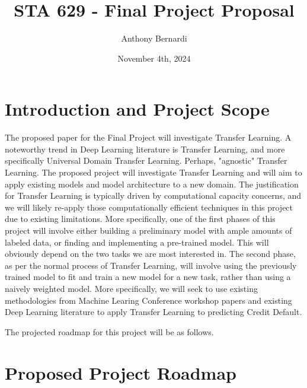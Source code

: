 \documentclass[12pt, letterpaper]{article}
\title{STA 629 - Final Project Proposal}
\author{Anthony Bernardi}
\date{November 4th, 2024}
\begin{document}
\maketitle

\section{Introduction and Project Scope}

The proposed paper for the Final Project will investigate Transfer Learning. A noteworthy trend in Deep Learning literature is Transfer Learning, and more specifically Universal Domain Transfer Learning. Perhaps, "agnostic" Transfer Learning. The proposed project will investigate Transfer Learning and will aim to apply existing models and model architecture to a new domain. 
The justification for Transfer Learning is typically driven by computational capacity concerns, and we will likely re-apply those computationally efficient techniques in this project due to existing limitations.  
More specifically, one of the first phases of this project will involve either building a preliminary model with ample amounts of labeled data, or finding and implementing a pre-trained model. This will obviously depend on the two tasks we are most interested in. 
The second phase, as per the normal process of Transfer Learning, will involve using the previously trained model to fit and train a new model for a new task, rather than using a naively weighted model. 
More specifically, we will seek to use existing methodologies from Machine Learing Conference workshop papers and existing Deep Learning literature to apply Transfer Learning to predicting Credit Default. 

The projected roadmap for this project will be as follows. 

\section{Proposed Project Roadmap}
\end{document}
